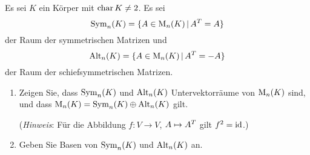 \documentclass[a4paper, 10pt]{scrartcl}
\begin{document}
\begin{question}[subtitle = Symmetrische und schiefsymmetrische Matrizen]
  Es sei $K$ ein Körper mit $\operatorname{char} K \neq 2$.
  Es sei
  \[
      \operatorname{Sym}_{n}(K)
    = \{ A \in \operatorname{M}_{n}(K) \,|\, A^T = A \}
  \]
  der Raum der symmetrischen Matrizen und
  \[
      \operatorname{Alt}_{n}(K)
    = \{ A \in \operatorname{M}_{n}(K) \,|\, A^T = -A\}
  \]
  der Raum der schiefsymmetrischen Matrizen.
  \begin{enumerate}
    \item
      Zeigen Sie, dass $\operatorname{Sym}_{n}(K)$ und $\operatorname{Alt}_{n}(K)$ Untervektorräume von $\operatorname{M}_{n}(K)$ sind, und dass $\operatorname{M}_{n}(K) = \operatorname{Sym}_{n}(K) \oplus \operatorname{Alt}_{n}(K)$ gilt.
      
      (\emph{Hinweis}:
       Für die Abbildung $f \colon V \to V$, $A \mapsto A^T$ gilt $f^2 = \operatorname{id}$.)
    \item
      Geben Sie Basen von $\operatorname{Sym}_{n}(K)$ und $\operatorname{Alt}_{n}(K)$ an.
  \end{enumerate}
\end{question}











\end{document}
